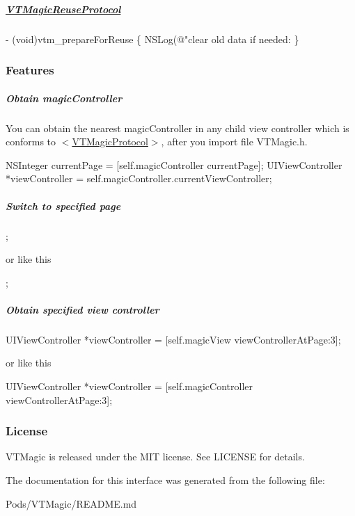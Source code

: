 \subparagraph*{\mbox{\hyperlink{class_v_t_magic_reuse_protocol-p}{V\+T\+Magic\+Reuse\+Protocol}}}


\begin{DoxyCode}
- (void)vtm\_prepareForReuse
\{
    NSLog(@"clear old data if needed:%
\}
\end{DoxyCode}


\subsubsection*{Features}

\subparagraph*{Obtain magic\+Controller}

You can obtain the nearest magic\+Controller in any child view controller which is conforms to {\ttfamily $<$\mbox{\hyperlink{class_v_t_magic_protocol-p}{V\+T\+Magic\+Protocol}}$>$}, after you import file {\ttfamily V\+T\+Magic.\+h}. 
\begin{DoxyCode}
NSInteger currentPage = [self.magicController currentPage];
UIViewController *viewController = self.magicController.currentViewController;
\end{DoxyCode}


\subparagraph*{Switch to specified page}


\begin{DoxyCode}
;
\end{DoxyCode}
 or like this 
\begin{DoxyCode}
;
\end{DoxyCode}
 \subparagraph*{Obtain specified view controller}


\begin{DoxyCode}
UIViewController *viewController = [self.magicView viewControllerAtPage:3];
\end{DoxyCode}
 or like this 
\begin{DoxyCode}
UIViewController *viewController = [self.magicController viewControllerAtPage:3];
\end{DoxyCode}


\subsubsection*{License}

V\+T\+Magic is released under the M\+IT license. See L\+I\+C\+E\+N\+SE for details. 

The documentation for this interface was generated from the following file\+:\begin{DoxyCompactItemize}
\item 
Pods/\+V\+T\+Magic/R\+E\+A\+D\+M\+E.\+md\end{DoxyCompactItemize}
